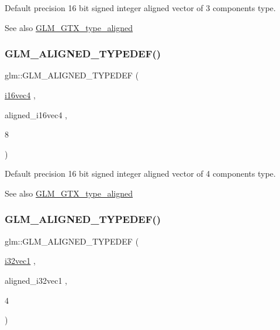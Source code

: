 Default precision 16 bit signed integer aligned vector of 3 components type. \begin{DoxySeeAlso}{See also}
\mbox{\hyperlink{group__gtx__type__aligned}{G\+L\+M\+\_\+\+G\+T\+X\+\_\+type\+\_\+aligned}} 
\end{DoxySeeAlso}
\mbox{\label{group__gtx__type__aligned_ga49f047ccaa8b31fad9f26c67bf9b3510}} 
\subsubsection{\texorpdfstring{GLM\_ALIGNED\_TYPEDEF()}{GLM\_ALIGNED\_TYPEDEF()}\hspace{0.1cm}{\footnotesize\ttfamily [60/209]}}
{\footnotesize\ttfamily glm\+::\+G\+L\+M\+\_\+\+A\+L\+I\+G\+N\+E\+D\+\_\+\+T\+Y\+P\+E\+D\+EF (\begin{DoxyParamCaption}\item[{\mbox{\hyperlink{group__gtc__type__precision_gaf074450c0e60b45114084b1df4012a1d}{i16vec4}}}]{,  }\item[{aligned\+\_\+i16vec4}]{,  }\item[{8}]{ }\end{DoxyParamCaption})}

Default precision 16 bit signed integer aligned vector of 4 components type. \begin{DoxySeeAlso}{See also}
\mbox{\hyperlink{group__gtx__type__aligned}{G\+L\+M\+\_\+\+G\+T\+X\+\_\+type\+\_\+aligned}} 
\end{DoxySeeAlso}
\mbox{\label{group__gtx__type__aligned_ga904e9c2436bb099397c0823506a0771f}} 
\subsubsection{\texorpdfstring{GLM\_ALIGNED\_TYPEDEF()}{GLM\_ALIGNED\_TYPEDEF()}\hspace{0.1cm}{\footnotesize\ttfamily [61/209]}}
{\footnotesize\ttfamily glm\+::\+G\+L\+M\+\_\+\+A\+L\+I\+G\+N\+E\+D\+\_\+\+T\+Y\+P\+E\+D\+EF (\begin{DoxyParamCaption}\item[{\mbox{\hyperlink{group__gtc__type__precision_ga05a766bbe2ad0791ed0081baac492da7}{i32vec1}}}]{,  }\item[{aligned\+\_\+i32vec1}]{,  }\item[{4}]{ }\end{DoxyParamCaption})}

